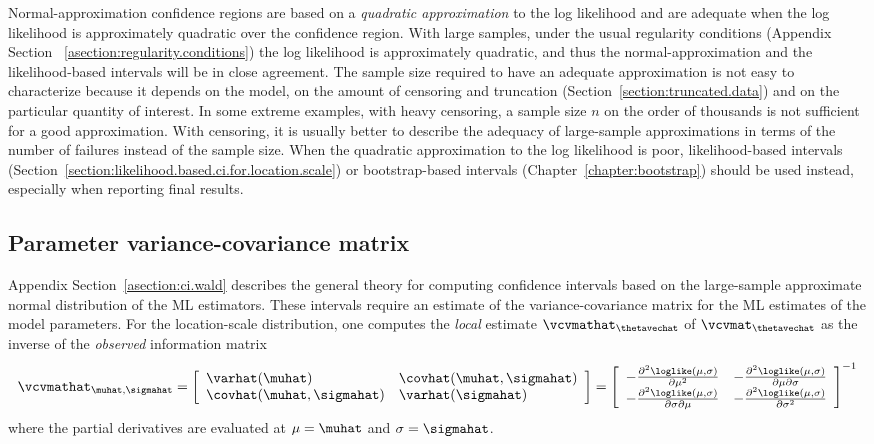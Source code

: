 Normal-approximation confidence regions are based on a {\em
quadratic approximation} to the log likelihood and are adequate when
the log likelihood is approximately quadratic over the confidence
region. With large samples, under the usual regularity conditions
(Appendix Section ~\ref{asection:regularity.conditions}) the log likelihood
is approximately quadratic, and thus the normal-approximation and
the likelihood-based intervals will be in close agreement. The
sample size required to have an adequate approximation is not easy
to characterize because it depends on the model, on the amount of
censoring and truncation (Section~\ref{section:truncated.data}) and
on the particular quantity of interest. In some extreme examples,
with heavy censoring, a sample size $n$ on the order of thousands is
not sufficient for a good approximation. With censoring, it is
usually better to describe the adequacy of large-sample
approximations in terms of the number of failures instead of the
sample size.  When the quadratic approximation to the log likelihood
is poor, likelihood-based intervals
(Section~\ref{section:likelihood.based.ci.for.location.scale}) or
bootstrap-based intervals (Chapter~\ref{chapter:bootstrap}) should
be used instead, especially when reporting final results.

\subsection{Parameter variance-covariance matrix}
\label{section:param.vcv.mat}
Appendix Section~\ref{asection:ci.wald} describes the general theory for
computing confidence intervals based on the large-sample approximate
normal distribution of the ML estimators. These intervals require
an estimate of the variance-covariance matrix for the ML
estimates of the model parameters. For the location-scale
distribution, one computes the {\em local} estimate
$\vcvmathat_{\thetavechat}$ of $\vcvmat_{\thetavechat}$ as the
inverse of the {\em observed} information matrix
\begin{equation}
\label{equation:ls.local.est.vcv}
\vcvmathat_{\muhat,\sigmahat}=
\left[ 
\begin{array}{ll}
\varhat(\muhat)& \covhat(\muhat,\sigmahat)\\
\covhat(\muhat,\sigmahat)& \varhat(\sigmahat)
\end{array}
\right]
=
\left[ 
\begin{array}{ll}
-\frac{\partial ^{2} \loglike(\mu,\sigma)}{\partial \mu^{2} }&
-\frac{\partial ^{2} \loglike(\mu,\sigma)}{\partial \mu \partial \sigma }\\
-\frac{\partial ^{2} \loglike(\mu,\sigma)}{\partial \sigma \partial \mu }&
-\frac{\partial ^{2} \loglike(\mu,\sigma)}{\partial \sigma^{2} }
\end{array}
\right]^{-1}
\end{equation}
where the partial derivatives are evaluated at $\mu=\muhat$
and $\sigma=\sigmahat$.

